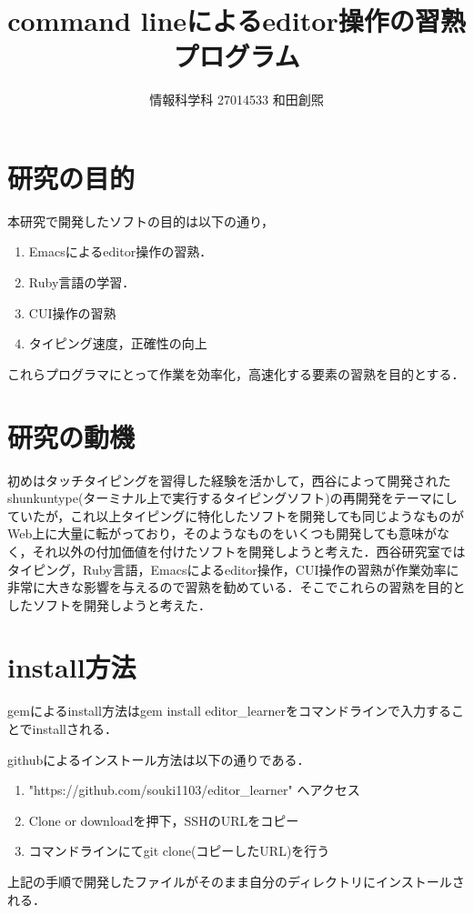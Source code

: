 \documentclass[a4j,twocolumn]{jsarticle}
\def\tightlist{\itemsep1pt\parskip0pt\parsep0pt}
\begin{document}
\title{command lineによるeditor操作の習熟プログラム}
\author{情報科学科 \hspace{5mm} 27014533 \hspace{5mm} 和田創煕}
\date{}
\maketitle

\section{研究の目的}
本研究で開発したソフトの目的は以下の通り，
\begin{enumerate}
\def\labelenumi{\arabic{enumi}.}
\tightlist
\item
Emacsによるeditor操作の習熟．
\item
Ruby言語の学習．
\item
CUI操作の習熟
\item
タイピング速度，正確性の向上
\end{enumerate}
これらプログラマにとって作業を効率化，高速化する要素の習熟を目的とする．


\section{研究の動機}
初めはタッチタイピングを習得した経験を活かして，西谷によって開発されたshunkuntype(ターミナル上で実行するタイピングソフト)の再開発をテーマにしていたが，これ以上タイピングに特化したソフトを開発しても同じようなものがWeb上に大量に転がっており，そのようなものをいくつも開発しても意味がなく，それ以外の付加価値を付けたソフトを開発しようと考えた．西谷研究室ではタイピング，Ruby言語，Emacsによるeditor操作，CUI操作の習熟が作業効率に非常に大きな影響を与えるので習熟を勧めている．そこでこれらの習熟を目的としたソフトを開発しようと考えた．

\section{install方法}
gemによるinstall方法はgem install editor\_learnerをコマンドラインで入力することでinstallされる．

githubによるインストール方法は以下の通りである．

\begin{enumerate}
\def\labelenumi{\arabic{enumi}.}
\tightlist
\item
  "https://github.com/souki1103/editor\_learner" へアクセス
\item
  Clone or downloadを押下，SSHのURLをコピー
\item
  コマンドラインにてgit clone(コピーしたURL)を行う
\end{enumerate}
上記の手順で開発したファイルがそのまま自分のディレクトリにインストールされる．
\end{document}
